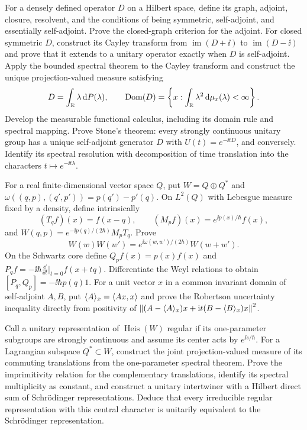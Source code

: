 \begin{exercise}
For a densely defined operator $D$ on a Hilbert space, define its graph,
adjoint, closure, resolvent, and the conditions of being symmetric,
self-adjoint, and essentially self-adjoint.  Prove the closed-graph criterion
for the adjoint.  For closed symmetric $D$, construct its Cayley transform
from $\operatorname{im}(D+\ii)$ to $\operatorname{im}(D-\ii)$ and prove that
it extends to a unitary operator exactly when $D$ is self-adjoint.  Apply the
bounded spectral theorem to the Cayley transform and construct the unique
projection-valued measure satisfying
\[
 D=\int_{\mathbb R}\lambda\,\mathrm d P(\lambda),\qquad
 \operatorname{Dom}(D)=
 \left\{x:\int_{\mathbb R}\lambda^2\,\mathrm d\mu_x(\lambda)<\infty\right\}.
\]
Develop the measurable functional calculus, including its domain rule and
spectral mapping.  Prove Stone's theorem: every strongly continuous unitary
group has a unique self-adjoint generator $D$ with
$U(t)=e^{-\ii tD}$, and conversely.
Identify its spectral resolution with decomposition of time translation into
the characters $t\mapsto e^{-\ii t\lambda}$.
\end{exercise}

\begin{exercise}
For a real finite-dimensional vector space $Q$, put
$W=Q\oplus Q^*$ and
$\omega((q,p),(q',p'))=p(q')-p'(q)$.  On $L^2(Q)$ with Lebesgue measure fixed
by a density, define intrinsically
\[
 (T_qf)(x)=f(x-q),\qquad (M_pf)(x)=e^{\ii p(x)/\hbar}f(x),
\]
and $W(q,p)=e^{-\ii p(q)/(2\hbar)}M_pT_q$.  Prove
\[
 W(w)W(w')=e^{\ii\omega(w,w')/(2\hbar)}W(w+w').
\]
On the Schwartz core define $Q_pf(x)=p(x)f(x)$ and
$P_qf=-\ii\hbar\frac{\dd}{\dd t}|_{t=0}f(x+tq)$.  Differentiate the Weyl
relations to obtain
$[P_q,Q_p]=-\ii\hbar p(q)1$.  For a unit vector $x$ in a common invariant
domain of self-adjoint $A,B$, put
$\langle A\rangle_x=\left\langle Ax,x\right\rangle$ and prove the Robertson uncertainty
inequality directly from positivity of
$\left\lVert (A-\langle A\rangle_x)x+\mathrm i t(B-\langle B\rangle_x)x\right\rVert^2$.
\end{exercise}

\begin{exercise}
Call a unitary representation of $\operatorname{Heis}(W)$ regular if its
one-parameter subgroups are strongly continuous and assume its center acts by
$e^{\ii s/\hbar}$.  For a Lagrangian subspace $Q^*\subset W$, construct the
joint projection-valued measure of its commuting translations from the
one-parameter spectral theorem.  Prove the imprimitivity relation for the
complementary translations, identify its spectral multiplicity as constant,
and construct a unitary intertwiner with a Hilbert direct sum of
Schr\"odinger representations.  Deduce that every irreducible regular
representation with this central character is unitarily equivalent to the
Schr\"odinger representation.
\end{exercise}

